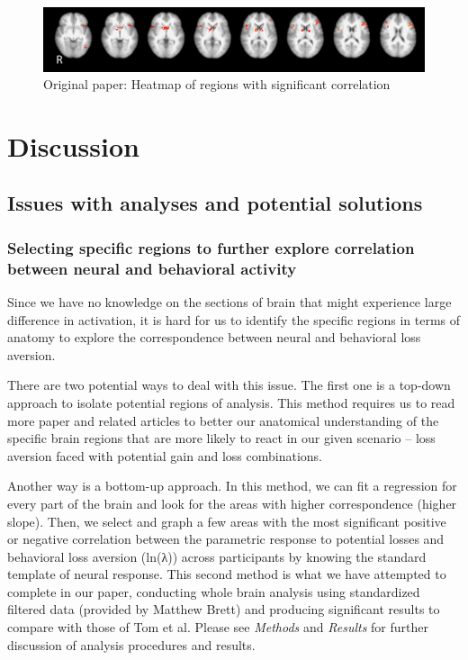 \documentclass[11pt]{article}
\begin{document}
\begin{figure}[H]
\centering
\includegraphics[scale=0.5]{figures/Regression3/Orig_sig_cor_z_neural_aversion.png}
\caption{Original paper: Heatmap of regions with significant correlation}
\end{figure}

\newpage


\section{Discussion}

\subsection{Issues with analyses and potential solutions}

\subsubsection{Selecting specific regions to further explore 
correlation between neural and behavioral activity}

\indent Since we have no knowledge on the sections of brain that might 
experience large difference in activation, it is hard for us to identify the 
specific regions in terms of anatomy to explore the correspondence between 
neural and behavioral loss aversion.

There are two potential ways to deal with this issue. The first one is a 
top-down approach to isolate potential regions of analysis. This method 
requires us to read more paper and related articles to better our anatomical 
understanding of the specific brain regions that are more likely to react in our 
given scenario -- loss aversion faced with potential gain and loss combinations.

Another way is a bottom-up approach. In this method, we can fit a regression for 
every part of the brain and look for the areas with higher correspondence 
(higher slope). Then, we select and graph a few areas with the most significant 
positive or negative correlation between the parametric response to potential 
losses and behavioral loss aversion (ln(λ)) across participants by knowing the 
standard template of neural response. This second method is what we have 
attempted to complete in our paper, conducting whole brain analysis using 
standardized filtered data (provided by Matthew Brett) and producing 
significant results to compare with those of Tom et al. Please see 
\textit{Methods} and \textit{Results} for further discussion of analysis 
procedures and results. 
\end{document}
